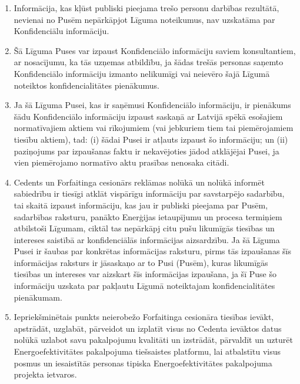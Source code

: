 \documentclass[a4paper]{article}
\begin{document}
\begin{multicols}{2}
\begin{enumerate}
  \item{Informācija, kas kļūst publiski pieejama trešo personu darbības
rezultātā, nevienai no Pusēm nepārkāpjot Līguma noteikumus, nav
uzskatāma par Konfidenciālu informāciju.}

  \item{Šā Līguma Puses var izpaust Konfidenciālo informāciju saviem
konsultantiem, ar nosacījumu, ka tās uzņemas atbildību, ja šādas
trešās personas saņemto Konfidenciālo informāciju izmanto
nelikumīgi vai neievēro šajā Līgumā noteiktos konfidencialitātes
pienākumus.}

  \item{Ja šā Līguma Pusei, kas ir saņēmusi Konfidenciālo informāciju, ir
pienākums šādu Konfidenciālo informāciju izpaust saskaņā ar Latvijā
spēkā esošajiem normatīvajiem aktiem vai rīkojumiem (vai
jebkuriem tiem tai piemērojamiem tiesību aktiem), tad: (i) šādai
Pusei ir atļauts izpaust šo informāciju; un (ii) paziņojums par
izpaušanas faktu ir nekavējoties jādod atklājējai Pusei, ja vien
piemērojamo normatīvo aktu prasības nenosaka citādi.}

  \item{Cedents un Forfaitinga cesionārs reklāmas nolūkā un nolūkā
informēt sabiedrību ir tiesīgi atklāt vispārīgu informāciju par
savstarpējo sadarbību, tai skaitā izpaust informāciju, kas jau ir
publiski pieejama par Pusēm, sadarbības raksturu, panākto Enerģijas
ietaupījumu un procesa termiņiem atbilstoši Līgumam, ciktāl tas
nepārkāpj citu pušu likumīgās tiesības un intereses saistībā ar
konfidenciālās informācijas aizsardzību. Ja šā Līguma Pusei ir šaubas
par konkrētas informācijas raksturu, pirms tās izpaušanas šīs
informācijas raksturs ir jāsaskaņo ar to Pusi (Pusēm), kuras likumīgās
tiesības un intereses var aizskart šīs informācijas izpaušana, ja šī Puse
šo informāciju uzskata par pakļautu Līgumā noteiktajam
konfidencialitātes pienākumam.}

  \item{Iepriekšminētais punkts neierobežo Forfaitinga cesionāra tiesības
ievākt, apstrādāt, uzglabāt, pārveidot un izplatīt visus no Cedenta
ievāktos datus nolūkā uzlabot savu pakalpojumu kvalitāti un
izstrādāt, pārvaldīt un uzturēt Energoefektivitātes pakalpojuma
tiešsaistes platformu, lai atbalstītu visus posmus un iesaistītās
personas tipiska Energoefektivitātes pakalpojuma projekta ietvaros.}


\end{enumerate}
\end{multicols}
\end{document}
